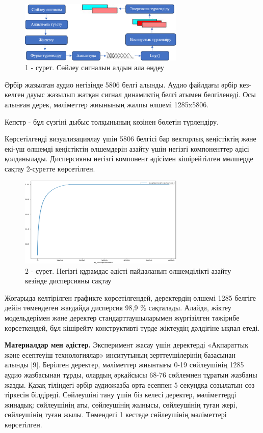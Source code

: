 \begin{figure}[H]
	\centering
	\includegraphics[width=0.7\textwidth]{media/ict/image5}
	\caption*{1 - сурет. Сөйлеу сигналын алдын ала өңдеу}
\end{figure}

\begin{multicols}{2}
Әрбір жазылған аудио негізінде 5806 белгі алынды. Аудио файлдағы әрбір
кез-келген дауыс жазылып жатқан сигнал динамиктің белгі атымен
белгіленеді. Осы алынған дерек, мәліметтер жиынының жалпы өлшемі
1285x5806.

Кепстр - бұл сүзгіні дыбыс толқынының көзінен бөлетін түрлендіру.

Көрсетілгенді визуализациялау үшін 5806 белгісі бар векторлық
кеңістіктің және екі-үш өлшемді кеңістіктің өлшемдерін азайту үшін
негізгі компоненттер әдісі қолданылады. Дисперсияны негізгі компонент
әдісімен кішірейтілген мөлшерде сақтау 2-суретте көрсетілген.
\end{multicols}

\begin{figure}[H]
	\centering
	\includegraphics[width=0.7\textwidth]{media/ict/image6}
	\caption*{2 - сурет. Негізгі құрамдас әдісті пайдаланып өлшемділікті азайту кезінде дисперсияны сақтау}
\end{figure}

\begin{multicols}{2}
Жоғарыда келтірілген графикте көрсетілгендей, деректердің өлшемі 1285
белгіге дейін төмендеген жағдайда дисперсия 98,9 \% сақталады. Алайда,
жіктеу модельдерімен және деректер стандарттаушыларымен жүргізілген
тәжірибе көрсеткендей, бұл кішірейту конструктивті түрде жіктеудің
дәлдігіне ықпал етеді.

{\bfseries Материалдар мен әдістер.} Эксперимент жасау үшін деректерді
«Ақпараттық және есептеуіш технологиялар» инситутының зерттеушілерінің
базасынан алынды {[}9{]}. Берілген деректер, мәліметтер жиынтығы 0-19
сөйлеушінің 1285 аудио жазбасынан тұрды, олардың әрқайсысы 68-76
сөйлемнен тұратын жазбаны жазды. Қазақ тіліндегі әрбір аудиожазба орта
есеппен 5 секундқа созылатын сөз тіркесін білдіреді. Сөйлеушіні тану
үшін біз келесі деректер, мәліметтерді жинадық: сөйлеушінің аты,
сөйлеушінің жынысы, сөйлеушінің туған жері, сөйлеушінің туған жылы.
Төмендегі 1 кестеде сөйлеушінің мәліметтері көрсетілген.
\end{multicols}

